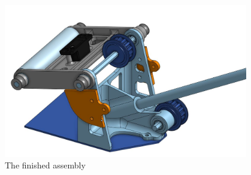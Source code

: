 \begin{figure}[htp]
\centering
\includegraphics[width=0.95\textwidth, angle=0]{Meetings/November/11-22-21/11-22-21_CAD_Figure5 - Nathan Forrer.JPG}
\caption{The finished assembly}
\label{fig:pic5}
\end{figure}



